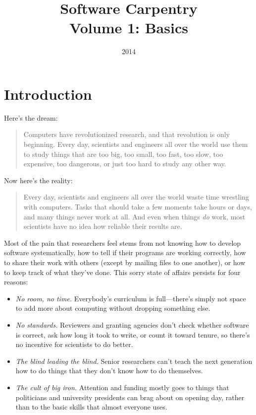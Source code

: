 \documentclass[]{book}
\title{Software Carpentry\\Volume 1: Basics}
\date{2014}
\begin{document}
\chapter{Introduction}\label{introduction}

Here's the dream:

\begin{quote}
Computers have revolutionized research, and that revolution is only
beginning. Every day, scientists and engineers all over the world use
them to study things that are too big, too small, too fast, too slow,
too expensive, too dangerous, or just too hard to study any other way.
\end{quote}

Now here's the reality:

\begin{quote}
Every day, scientists and engineers all over the world waste time
wrestling with computers. Tasks that should take a few moments take
hours or days, and many things never work at all. And even when things
\emph{do} work, most scientists have no idea how reliable their results
are.
\end{quote}

Most of the pain that researchers feel stems from not knowing how to
develop software systematically, how to tell if their programs are
working correctly, how to share their work with others (except by
mailing files to one another), or how to keep track of what they've
done. This sorry state of affairs persists for four reasons:

\begin{itemize}
\item
  \emph{No room, no time.} Everybody's curriculum is full---there's
  simply not space to add more about computing without dropping
  something else.
\item
  \emph{No standards.} Reviewers and granting agencies don't check
  whether software is correct, ask how long it took to write, or count
  it toward tenure, so there's no incentive for scientists to do better.
\item
  \emph{The blind leading the blind.} Senior researchers can't teach the
  next generation how to do things that they don't know how to do
  themselves.
\item
  \emph{The cult of big iron.} Attention and funding mostly goes to
  things that politicians and university presidents can brag about on
  opening day, rather than to the basic skills that almost everyone
  uses.
\end{itemize}
\end{document}
